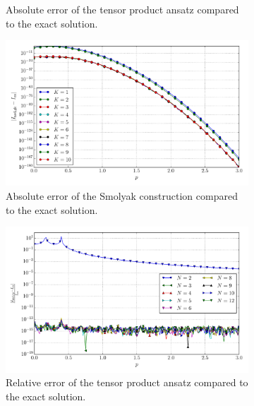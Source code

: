 \documentclass[a4paper,10pt]{article}
\begin{document}
\begin{figure}[ht!]
\begin{subfigure}[t]{0.5\linewidth}
    \caption{Absolute error of the tensor product ansatz compared to the exact solution.}
    \label{fig:tp_sg_4d_conv_p_0211_1210_err_nsd_tp}
  \end{subfigure}
  \begin{subfigure}[t]{0.5\linewidth}
    \includegraphics[width=\linewidth]{./plots/tp_sg_4d_conv_p_(0,2,1,1)_(1,2,1,0)_err_nsd_gk.pdf}
    \caption{Absolute error of the Smolyak construction compared to the exact solution.}
    \label{fig:tp_sg_4d_conv_p_0211_1210_err_nsd_gk}
  \end{subfigure}
  \begin{subfigure}[t]{0.5\linewidth}
    \includegraphics[width=\linewidth]{./plots/tp_sg_4d_conv_p_(0,2,1,1)_(1,2,1,0)_err_rel_nsd_tp.pdf}
    \caption{Relative error of the tensor product ansatz compared to the exact solution.}
    \label{fig:tp_sg_4d_conv_p_0211_1210_err_rel_nsd_tp}
  \end{subfigure}
  \begin{subfigure}[t]{0.5\linewidth}

\end{subfigure}
\end{figure}
\end{document}
